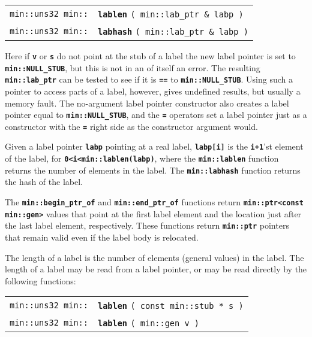 \documentclass[12pt]{article}
\makeatletter
\newcommand{\TT}[1]{{\tt \bfseries #1}}
\newcommand{\ttindex}[1]{\index{#1@{\tt #1}}}
\newcommand{\EOL}{\penalty \exhyphenpenalty}
\newenvironment{indpar}[1][0.3in]%
	{\begin{list}{}%
		     {\setlength{\itemsep}{0in}%
		      \setlength{\topsep}{0in}%
		      \setlength{\parsep}{1ex}%
		      \setlength{\labelwidth}{#1}%
		      \setlength{\leftmargin}{#1}%
		      \addtolength{\leftmargin}{\labelsep}}%
	 \item}%
	{\end{list}}
\newcommand{\LABEL}[1]{\label{#1}}
\newcommand{\MINKEY}[1]%
	   {\TT{#1}\ttindex{min::#1}\ttindex{#1}}
\makeatother
\begin{document}
\begin{indpar}\begin{tabular}{r@{}l}
\verb|min::uns32 min::|
	& \MINKEY{lablen} \verb|( min::lab_ptr & labp )|
\LABEL{MIN::LENGTH_OF_LAB_PTR} \\
\verb|min::uns32 min::|
	& \MINKEY{labhash} \verb|( min::lab_ptr & labp )|
\LABEL{MIN::HASH_OF_LAB_PTR} \\
\end{tabular}\end{indpar}

Here if \TT{v} or \TT{s} do not point at the stub of a label
the new label pointer is set to \TT{min::\EOL NULL\_\EOL STUB},
but this is not in an of itself an error.  The resulting
\TT{min::\EOL lab\_\EOL ptr} can be tested to see if it is \TT{==}
to \TT{min::\EOL NULL\_\EOL STUB}.  Using such a pointer to access
parts of a label, however, gives undefined results,
but usually a memory fault.
The no-argument label
pointer constructor also creates a label pointer equal to
\TT{min::\EOL NULL\_\EOL STUB}, and the \TT{=} operators
set a label pointer just as a constructor with the \TT{=} right side
as the constructor argument would.

Given a label pointer \TT{labp} pointing at a real label,
\TT{labp[i]} is the \TT{i+1}'st
element of the label, for
\TT{0<i<min::lablen(labp)},
where the \TT{min::\EOL lablen} function
returns the number of elements in the label.
The \TT{min::\EOL labhash} function returns the hash of the label.

The \TT{min::\EOL begin\_\EOL ptr\_\EOL of} and
\TT{min::\EOL end\_\EOL ptr\_\EOL of}
functions return \TT{min::\EOL ptr<const min::\EOL gen>} values that
point at the first label element and the location just after the
last label element, respectively.
These functions return \TT{min::ptr} pointers that
remain valid even if the label body is relocated.

The length of a label is the number of elements (general values) in the label.
The length of a label may be read from a label pointer, or may be read
directly by the following functions:

\begin{indpar}\begin{tabular}{r@{}l}
\verb|min::uns32 min::| & \MINKEY{lablen} \verb|( const min::stub * s )|
\LABEL{MIN::LABLEN} \\
\verb|min::uns32 min::| & \MINKEY{lablen} \verb|( min::gen v )|
\LABEL{MIN::LABLEN_OF_GEN} \\
\end{tabular}\end{indpar}
\end{document}
